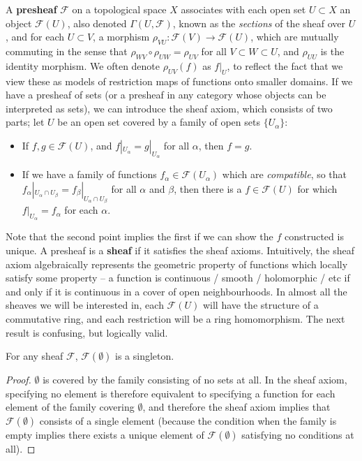 A {\bf presheaf} $\mathcal{F}$ on a topological space $X$ associates with each open set $U \subset X$ an object $\mathcal{F}(U)$, also denoted $\Gamma(U,\mathcal{F})$, known as the {\it sections} of the sheaf over $U$, and for each $U \subset V$, a morphism $\rho_{VU}: \mathcal{F}(V) \to \mathcal{F}(U)$, which are mutually commuting in the sense that $\rho_{WV} \circ \rho_{UW} = \rho_{UV}$ for all $V \subset W \subset U$, and $\rho_{UU}$ is the identity morphism. We often denote $\rho_{UV}(f)$ as $f|_U$, to reflect the fact that we view these as models of restriction maps of functions onto smaller domains. If we have a presheaf of sets (or a presheaf in any category whose objects can be interpreted as sets), we can introduce the sheaf axiom, which consists of two parts; let $U$ be an open set covered by a family of open sets $\{ U_\alpha \}$:
%
\begin{itemize}
    \item If $f,g \in \mathcal{F}(U)$, and $f|_{U_\alpha} = g|_{U_\alpha}$ for all $\alpha$, then $f = g$.

    \item If we have a family of functions $f_\alpha \in \mathcal{F}(U_\alpha)$ which are {\it compatible}, so that $f_\alpha|_{U_\alpha \cap U_\beta} = f_\beta|_{U_\alpha \cap U_\beta}$ for all $\alpha$ and $\beta$, then there is a $f \in \mathcal{F}(U)$ for which $f|_{U_\alpha} = f_\alpha$ for each $\alpha$.
\end{itemize}
%
Note that the second point implies the first if we can show the $f$ constructed is unique. A presheaf is a {\bf sheaf} if it satisfies the sheaf axioms. Intuitively, the sheaf axiom algebraically represents the geometric property of functions which locally satisfy some property -- a function is continuous / smooth / holomorphic / etc if and only if it is continuous in a cover of open neighbourhoods. In almost all the sheaves we will be interested in, each $\mathcal{F}(U)$ will have the structure of a commutative ring, and each restriction will be a ring homomorphism. The next result is confusing, but logically valid.

\begin{lemma}
    For any sheaf $\mathcal{F}$, $\mathcal{F}(\emptyset)$ is a singleton.
\end{lemma}
\begin{proof}
    $\emptyset$ is covered by the family consisting of no sets at all. In the sheaf axiom, specifying no element is therefore equivalent to specifying a function for each element of the family covering $\emptyset$, and therefore the sheaf axiom implies that $\mathcal{F}(\emptyset)$ consists of a single element (because the condition when the family is empty implies there exists a unique element of $\mathcal{F}(\emptyset)$ satisfying no conditions at all).
\end{proof}

